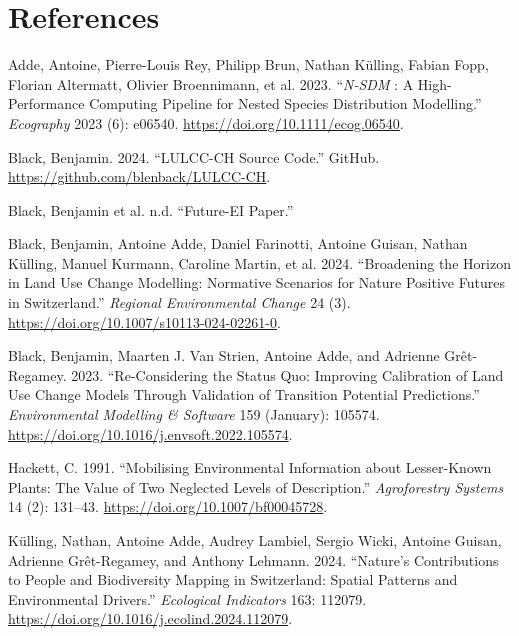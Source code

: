 \documentclass[
  letterpaper,
  DIV=11,
  numbers=noendperiod]{scrreprt}
\newlength{\cslhangindent}
\newenvironment{CSLReferences}[2] %
 {\begin{list}{}{%
  \setlength{\itemindent}{0pt}
  \setlength{\leftmargin}{0pt}
  \setlength{\parsep}{0pt}
  \ifodd #1
   \setlength{\leftmargin}{\cslhangindent}
   \setlength{\itemindent}{-1\cslhangindent}
  \fi
  \setlength{\itemsep}{#2\baselineskip}}}
 {\end{list}}
\begin{document}

\chapter*{References}\label{references}


\label{refs}
\begin{CSLReferences}{1}{0}
Adde, Antoine, Pierre-Louis Rey, Philipp Brun, Nathan Külling, Fabian
Fopp, Florian Altermatt, Olivier Broennimann, et al. 2023.
{``{\emph{N-}}{\emph{SDM}} : A High-Performance Computing Pipeline for
{Nested Species Distribution Modelling}.''} \emph{Ecography} 2023 (6):
e06540. \url{https://doi.org/10.1111/ecog.06540}.

Black, Benjamin. 2024. {``LULCC-CH Source Code.''} GitHub.
\url{https://github.com/blenback/LULCC-CH}.

Black, Benjamin et al. n.d. {``Future-EI Paper.''}

Black, Benjamin, Antoine Adde, Daniel Farinotti, Antoine Guisan, Nathan
Külling, Manuel Kurmann, Caroline Martin, et al. 2024. {``Broadening the
Horizon in Land Use Change Modelling: Normative Scenarios for Nature
Positive Futures in Switzerland.''} \emph{Regional Environmental Change}
24 (3). \url{https://doi.org/10.1007/s10113-024-02261-0}.

Black, Benjamin, Maarten J. Van Strien, Antoine Adde, and Adrienne
Grêt-Regamey. 2023. {``Re-Considering the Status Quo: {Improving}
Calibration of Land Use Change Models Through Validation of Transition
Potential Predictions.''} \emph{Environmental Modelling \& Software} 159
(January): 105574. \url{https://doi.org/10.1016/j.envsoft.2022.105574}.

Hackett, C. 1991. {``Mobilising Environmental Information about
Lesser-Known Plants: The Value of Two Neglected Levels of
Description.''} \emph{Agroforestry Systems} 14 (2): 131--43.
\url{https://doi.org/10.1007/bf00045728}.

Külling, Nathan, Antoine Adde, Audrey Lambiel, Sergio Wicki, Antoine
Guisan, Adrienne Grêt-Regamey, and Anthony Lehmann. 2024. {``Nature's
Contributions to People and Biodiversity Mapping in Switzerland: Spatial
Patterns and Environmental Drivers.''} \emph{Ecological Indicators} 163:
112079. \url{https://doi.org/10.1016/j.ecolind.2024.112079}.


\end{CSLReferences}
\end{document}

